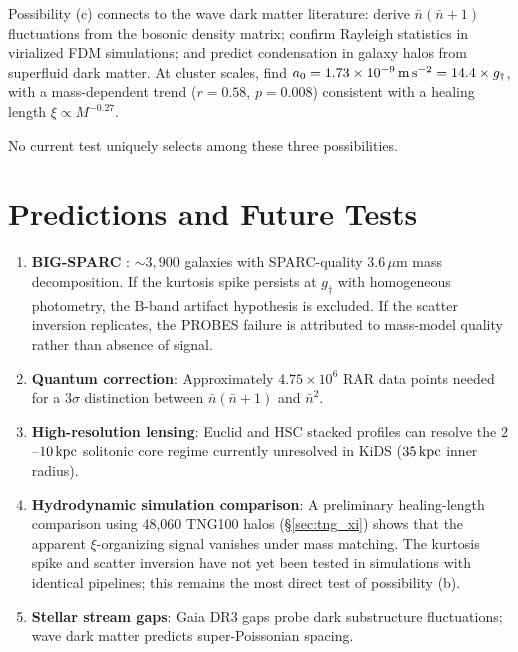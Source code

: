 \documentclass[twocolumn,twocolappendix]{aastex631}
\newcommand{\gdag}{g_{\dagger}}
\newcommand{\nbar}{\bar{n}}
\begin{document}
Possibility (c) connects to the wave dark matter literature:
\citet{Cheong2024} derive $\nbar(\nbar+1)$ fluctuations from the bosonic
density matrix; \citet{Centers2021} confirm Rayleigh statistics in
virialized FDM simulations; \citet{Khoury2016} and \citet{Berezhiani2015}
predict condensation in galaxy halos from superfluid dark matter. At cluster
scales, \citet{Tian2020} find $a_0 = 1.73 \times 10^{-9}\,{\rm m\,s^{-2}}
= 14.4\times\gdag$, with a mass-dependent trend ($r = 0.58$, $p = 0.008$)
consistent with a healing length $\xi \propto M^{-0.27}$.

No current test uniquely selects among these three possibilities.

\section{Predictions and Future Tests} \label{sec:predictions}

\begin{enumerate}
    \item \textbf{BIG-SPARC} \citep{Haubner2024}: $\sim\!3{,}900$ galaxies
    with SPARC-quality 3.6\,$\mu$m mass decomposition. If the kurtosis
    spike persists at $\gdag$ with homogeneous photometry, the B-band
    artifact hypothesis is excluded. If the scatter inversion replicates,
    the PROBES failure is attributed to mass-model quality rather than
    absence of signal.
    \item \textbf{Quantum correction}: Approximately $4.75 \times 10^6$ RAR
    data points needed for a $3\sigma$ distinction between $\nbar(\nbar+1)$
    and $\nbar^2$.
    \item \textbf{High-resolution lensing}: Euclid and HSC stacked profiles
    can resolve the $2$--$10\,{\rm kpc}$ solitonic core regime currently
    unresolved in KiDS ($35\,{\rm kpc}$ inner radius).
    \item \textbf{Hydrodynamic simulation comparison}: A preliminary
    healing-length comparison using 48{,}060 TNG100 halos
    (\S\ref{sec:tng_xi}) shows that the apparent $\xi$-organizing
    signal vanishes under mass matching. The kurtosis spike and scatter
    inversion have not yet been tested in simulations with identical
    pipelines; this remains the most direct test of possibility (b).
    \item \textbf{Stellar stream gaps}: Gaia DR3 gaps probe dark
    substructure fluctuations; wave dark matter predicts super-Poissonian
    spacing.
\end{enumerate}
\end{document}
